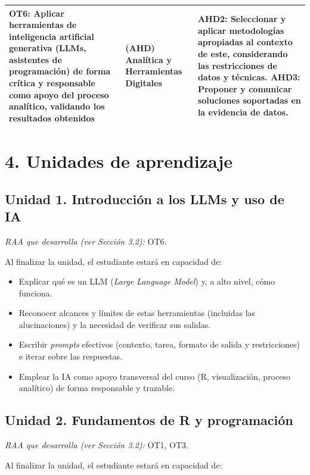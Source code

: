 \documentclass[11pt,a4paper]{article}
\begin{document}
\begin{longtable}{|p{5cm}|p{4cm}|p{6cm}|}
OT6: Aplicar herramientas de inteligencia artificial generativa (LLMs, asistentes de programación) de forma crítica y responsable como apoyo del proceso analítico, validando los resultados obtenidos &
(AHD) Analítica y Herramientas Digitales &
AHD2: Seleccionar y aplicar metodologías apropiadas al contexto de este, considerando las restricciones de datos y técnicas. 
AHD3: Proponer y comunicar soluciones soportadas en la evidencia de datos. \\
\hline

\end{longtable}

\section*{4. Unidades de aprendizaje}

\subsection*{Unidad 1. Introducción a los LLMs y uso de IA}

\textit{RAA que desarrolla (ver Sección 3.2):} OT6.

Al finalizar la unidad, el estudiante estará en capacidad de:

\begin{itemize}
    \item Explicar qué es un LLM (\textit{Large Language Model}) y, a alto nivel, cómo funciona.
    \item Reconocer alcances y límites de estas herramientas (incluidas las alucinaciones) y la necesidad de verificar sus salidas.
    \item Escribir \textit{prompts} efectivos (contexto, tarea, formato de salida y restricciones) e iterar sobre las respuestas.
    \item Emplear la IA como apoyo transversal del curso (R, visualización, proceso analítico) de forma responsable y trazable.
\end{itemize}

\subsection*{Unidad 2. Fundamentos de R y programación}

\textit{RAA que desarrolla (ver Sección 3.2):} OT1, OT3.

Al finalizar la unidad, el estudiante estará en capacidad de:
\end{document}
